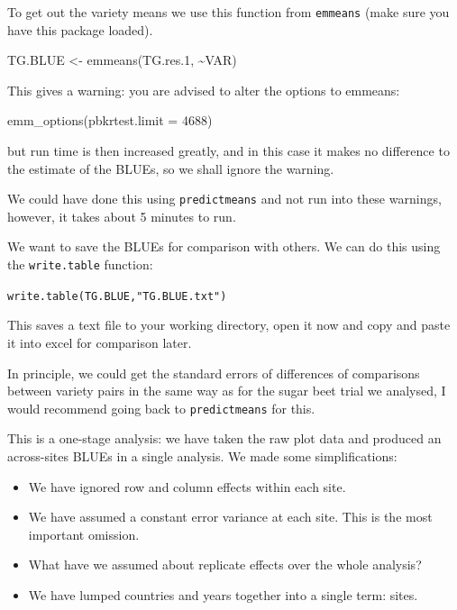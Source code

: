 \documentclass[
]{book}
\newenvironment{Shaded}{\begin{snugshade}}{\end{snugshade}}
\newcommand{\AttributeTok}[1]{\textcolor[rgb]{0.77,0.63,0.00}{#1}}
\newcommand{\DecValTok}[1]{\textcolor[rgb]{0.00,0.00,0.81}{#1}}
\newcommand{\FloatTok}[1]{\textcolor[rgb]{0.00,0.00,0.81}{#1}}
\newcommand{\FunctionTok}[1]{\textcolor[rgb]{0.00,0.00,0.00}{#1}}
\newcommand{\NormalTok}[1]{#1}
\newcommand{\OtherTok}[1]{\textcolor[rgb]{0.56,0.35,0.01}{#1}}
\newcommand{\SpecialCharTok}[1]{\textcolor[rgb]{0.00,0.00,0.00}{#1}}
\begin{document}
To get out the variety means we use this function from \texttt{emmeans} (make sure you have this package loaded).

\begin{Shaded}
\begin{Highlighting}[]
\NormalTok{TG.BLUE }\OtherTok{\textless{}{-}} \FunctionTok{emmeans}\NormalTok{(TG.res}\FloatTok{.1}\NormalTok{, }\SpecialCharTok{\textasciitilde{}}\NormalTok{VAR)}
\end{Highlighting}
\end{Shaded}

This gives a warning: you are advised to alter the options to emmeans:

\begin{Shaded}
\begin{Highlighting}[]
\FunctionTok{emm\_options}\NormalTok{(}\AttributeTok{pbkrtest.limit =} \DecValTok{4688}\NormalTok{)}
\end{Highlighting}
\end{Shaded}

but run time is then increased greatly, and in this case it makes no difference to the estimate of the BLUEs, so we shall ignore the warning.

We could have done this using \texttt{predictmeans} and not run into these warnings, however, it takes about 5 minutes to run.

We want to save the BLUEs for comparison with others. We can do this using the \texttt{write.table} function:

\texttt{write.table(TG.BLUE,"TG.BLUE.txt")}

This saves a text file to your working directory, open it now and copy and paste it into excel for comparison later.

In principle, we could get the standard errors of differences of comparisons between variety pairs in the same way as for the sugar beet trial we analysed, I would recommend going back to \texttt{predictmeans} for this.

This is a one-stage analysis: we have taken the raw plot data and produced an across-sites BLUEs in a single analysis. We made some simplifications:

\begin{itemize}
\item
  We have ignored row and column effects within each site.
\item
  We have assumed a constant error variance at each site. This is the most important omission.
\item
  What have we assumed about replicate effects over the whole analysis?
\item
  We have lumped countries and years together into a single term: sites.
\end{itemize}
\end{document}
